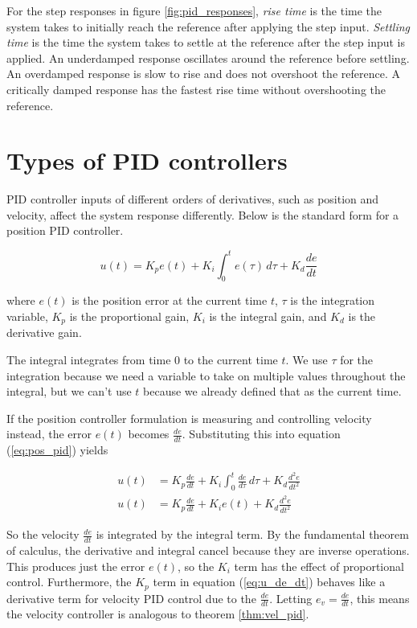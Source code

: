 For the step responses in figure \ref{fig:pid_responses}, \textit{rise time} is
the time the system takes to initially reach the \gls{reference} after applying
the step input. \textit{Settling time} is the time the system takes to settle at
the \gls{reference} after the step input is applied. An underdamped response
oscillates around the \gls{reference} before settling. An overdamped response is
slow to rise and does not overshoot the \gls{reference}. A critically damped
response has the fastest rise time without overshooting the \gls{reference}.

\section{Types of PID controllers}

PID controller inputs of different orders of derivatives, such as position and
velocity, affect the \gls{system} response differently. Below is the standard
form for a position PID controller.

\begin{definition}
  \begin{equation}
    u(t) = K_p e(t) + K_i \int_0^t e(\tau) \,d\tau + K_d \frac{de}{dt}
    \label{eq:pos_pid}
  \end{equation}

  where $e(t)$ is the position error at the current time $t$, $\tau$ is the
  integration variable, $K_p$ is the proportional gain, $K_i$ is the integral
  gain, and $K_d$ is the derivative gain.
\end{definition}

The integral integrates from time $0$ to the current time $t$. We use $\tau$ for
the integration because we need a variable to take on multiple values throughout
the integral, but we can't use $t$ because we already defined that as the
current time.

If the position controller formulation is measuring and controlling velocity
instead, the error $e(t)$ becomes $\frac{de}{dt}$. Substituting this into
equation (\ref{eq:pos_pid}) yields

\begin{align}
  u(t) &= K_p \frac{de}{dt} + K_i \int_0^t \frac{de}{d\tau} \,d\tau +
    K_d \frac{d^2e}{dt^2} \nonumber \\
  u(t) &= K_p \frac{de}{dt} + K_i e(t) + K_d \frac{d^2e}{dt^2}
    \label{eq:u_de_dt}
\end{align}

So the velocity $\frac{de}{dt}$ is integrated by the integral term. By the
fundamental theorem of calculus, the derivative and integral cancel because they
are inverse operations. This produces just the error $e(t)$, so the $K_i$ term
has the effect of proportional control. Furthermore, the $K_p$ term in equation
(\ref{eq:u_de_dt}) behaves like a derivative term for velocity PID control due
to the $\frac{de}{dt}$. Letting $e_v = \frac{de}{dt}$, this means the velocity
controller is analogous to theorem \ref{thm:vel_pid}.

